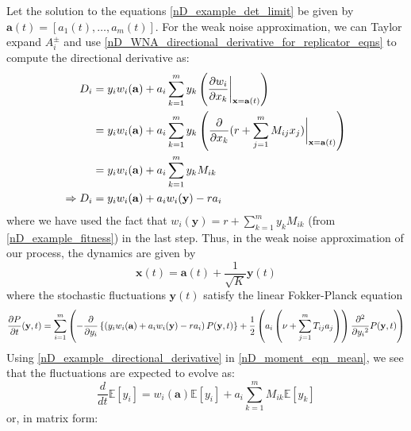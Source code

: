 Let the solution to the equations \eqref{nD_example_det_limit} be given by $\mathbf{a}(t) = [a_1(t),\ldots,a_m(t)]$. For the weak noise approximation, we can Taylor expand $A^{\pm}_i$ and use \eqref{nD_WNA_directional_derivative_for_replicator_eqns} to compute the directional derivative as:
\begin{align}
D_i &= y_iw_i(\mathbf{a}) + a_i\sum\limits_{k=1}^{m}y_k\left(\frac{\partial w_i}{\partial x_k}\bigg{|}_{\mathbf{x}=\mathbf{a}(t)}\right)\\
&= y_iw_i(\mathbf{a}) + a_i\sum\limits_{k=1}^{m}y_k\left(\frac{\partial}{\partial x_k}(r+\sum\limits_{j=1}^{m}M_{ij}x_j)\bigg{|}_{\mathbf{x}=\mathbf{a}(t)}\right)\\
&= y_iw_i(\mathbf{a}) + a_i\sum\limits_{k=1}^{m}y_kM_{ik}\\
\Rightarrow D_i &= y_iw_i(\mathbf{a}) + a_iw_i(\mathbf{y}) - ra_i\label{nD_example_directional_derivative}
\end{align}
where we have used the fact that $w_i(\mathbf{y}) = r + \sum\limits_{k=1}^{m}y_kM_{ik}$ (from \eqref{nD_example_fitness}) in the last step. Thus, in the weak noise approximation of our process, the dynamics are given by
\begin{equation}
\mathbf{x}(t) = \mathbf{a}(t) + \frac{1}{\sqrt{K}}\mathbf{y}(t)
\end{equation}
where the stochastic fluctuations $\mathbf{y}(t)$ satisfy the linear Fokker-Planck equation
\begin{equation}
\resizebox{1.1\textwidth}{!}{$\displaystyle\frac{\partial P}{\partial t}(\mathbf{y},t) = \sum\limits_{i=1}^{m}\left(-\frac{\partial}{\partial y_i}\left\{\left(y_iw_i(\mathbf{a}) + a_iw_i(\mathbf{y}) - ra_i\right)P(\mathbf{y},t)\right\}+\frac{1}{2}\left(a_i\left(\nu + \sum\limits_{j=1}^{m}T_{ij}a_j\right)\right)\frac{\partial^2}{\partial{y_i}^2}P(\mathbf{y},t)\right)$}
\end{equation}
Using \eqref{nD_example_directional_derivative} in \eqref{nD_moment_eqn_mean}, we see that the fluctuations are expected to evolve as:
\begin{equation}
\label{nD_example_moment_eqn_mean}
\frac{d}{dt}\mathbb{E}[y_i] = w_i(\mathbf{a})\mathbb{E}[y_i] + a_i\sum\limits_{k=1}^{m}M_{ik}\mathbb{E}[y_k]
\end{equation}
or, in matrix form:
